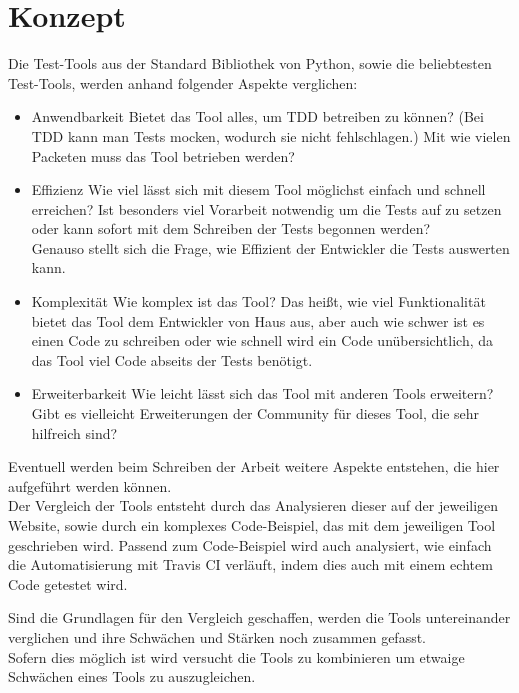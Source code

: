 \section{Konzept}
Die Test-Tools aus der Standard Bibliothek von Python, sowie die beliebtesten
Test-Tools, werden anhand folgender Aspekte verglichen:

\begin{itemize}
    \item Anwendbarkeit
        \subitem Bietet das Tool alles, um TDD betreiben zu können? (Bei TDD
        kann man Tests \gls{mocken}, wodurch sie nicht fehlschlagen.)
        Mit wie vielen Packeten muss das Tool betrieben werden?
    \item Effizienz
        \subitem Wie viel lässt sich mit diesem Tool möglichst einfach und
        schnell erreichen? Ist besonders viel Vorarbeit notwendig um die Tests
        auf zu setzen oder kann sofort mit dem Schreiben der Tests begonnen
        werden?
        \newline
        \\
        Genauso stellt sich die Frage, wie Effizient der Entwickler die Tests
        auswerten kann.
    \item Komplexität
        \subitem Wie komplex ist das Tool? Das heißt, wie viel Funktionalität
        bietet das Tool dem Entwickler von Haus aus, aber auch wie schwer
        ist es einen Code zu schreiben oder wie schnell wird ein Code unübersichtlich, da
        das Tool viel Code abseits der Tests benötigt.
    \item Erweiterbarkeit
        \subitem Wie leicht lässt sich das Tool mit anderen Tools erweitern?
        Gibt es vielleicht Erweiterungen der Community für dieses Tool, die sehr
        hilfreich sind?
\end{itemize}
Eventuell werden beim Schreiben der Arbeit weitere Aspekte entstehen, die hier
aufgeführt werden können.
\newline
\\
Der Vergleich der Tools entsteht durch das Analysieren dieser auf der
jeweiligen Website, sowie durch ein komplexes Code-Beispiel, das mit dem
jeweiligen Tool geschrieben wird. Passend zum Code-Beispiel wird auch analysiert,
wie einfach die Automatisierung mit Travis CI verläuft, indem dies auch mit einem
echtem Code getestet wird.

Sind die Grundlagen für den Vergleich geschaffen, werden die Tools
untereinander verglichen und ihre Schwächen und Stärken noch zusammen
gefasst.
\newline
\\
Sofern dies möglich ist wird versucht die Tools zu kombinieren um etwaige
Schwächen eines Tools zu auszugleichen.


